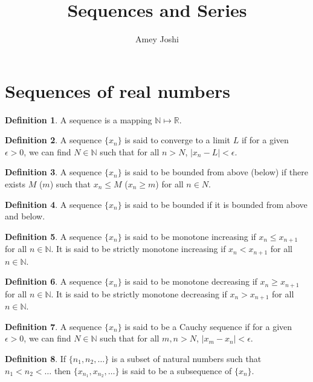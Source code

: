 \documentclass{article}
\theoremstyle{plain}
\numberwithin{thm}{section}
\theoremstyle{plain}
\numberwithin{prop}{section}
\theoremstyle{definition}
\newtheorem{defn}{Definition}
\numberwithin{defn}{section}
\theoremstyle{remark}
\numberwithin{equation}{section}
\begin{document}
\title{Sequences and Series}
\author{Amey Joshi}
\maketitle
\section{Sequences of real numbers}\label{s1}
\begin{defn}\label{s1d1}
A sequence is a mapping $\mathbb{N} \mapsto \mathbb{R}$.
\end{defn}

\begin{defn}\label{s1d2}
A sequence $\{x_n\}$ is said to converge to a limit $L$ if for a given 
$\epsilon > 0$, we can find $N \in \mathbb{N}$ such that for all $n > N$, 
$|x_n - L| < \epsilon$.
\end{defn}

\begin{defn}\label{s1d3}
A sequence $\{x_n\}$ is said to be bounded from above (below) if there exists
$M$ ($m$) such that $x_n \le M$ ($x_n \ge m$) for all $n \in N$.
\end{defn}

\begin{defn}\label{s1d4}
A sequence $\{x_n\}$ is said to be bounded if it is bounded from above and below.
\end{defn}

\begin{defn}\label{s1d5}
A sequence $\{x_n\}$ is said to be monotone increasing if $x_n \le x_{n+1}$ for
all $n \in \mathbb{N}$. It is said to be strictly monotone increasing if $x_n <
x_{n+1}$ for all $n \in \mathbb{N}$.
\end{defn}

\begin{defn}\label{s1d6}
A sequence $\{x_n\}$ is said to be monotone decreasing if $x_n \ge x_{n+1}$ for
all $n \in \mathbb{N}$. It is said to be strictly monotone decreasing if $x_n >
x_{n+1}$ for all $n \in \mathbb{N}$.
\end{defn}

\begin{defn}\label{s1d7}
A sequence $\{x_n\}$ is said to be a Cauchy sequence if for a given $\epsilon
> 0$, we can find $N \in \mathbb{N}$ such that for all $m, n > N$, $|x_m - x_n| <
\epsilon$.
\end{defn}

\begin{defn}\label{s1d8}
If $\{n_1, n_2, \ldots\}$ is a subset of natural numbers such that $n_1 < n_2
< \ldots$ then $\{x_{n_1}, x_{n_2}, \ldots\}$ is said to be a subsequence of 
$\{x_n\}$.
\end{defn}
\end{document}
